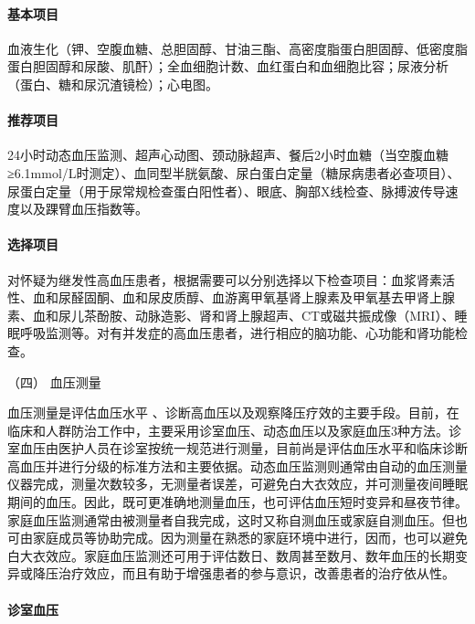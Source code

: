 \paragraph{基本项目}

血液生化（钾、空腹血糖、总胆固醇、甘油三酯、高密度脂蛋白胆固醇、低密度脂蛋白胆固醇和尿酸、肌酐）；全血细胞计数、血红蛋白和血细胞比容；尿液分析（蛋白、糖和尿沉渣镜检）；心电图。

\paragraph{推荐项目}

24小时动态血压监测、超声心动图、颈动脉超声、餐后2小时血糖（当空腹血糖≥6.1mmol/L时测定）、血同型半胱氨酸、尿白蛋白定量（糖尿病患者必查项目）、尿蛋白定量（用于尿常规检查蛋白阳性者）、眼底、胸部X线检查、脉搏波传导速度以及踝臂血压指数等。

\paragraph{选择项目}

对怀疑为继发性高血压患者，根据需要可以分别选择以下检查项目：血浆肾素活性、血和尿醛固酮、血和尿皮质醇、血游离甲氧基肾上腺素及甲氧基去甲肾上腺素、血和尿儿茶酚胺、动脉造影、肾和肾上腺超声、CT或磁共振成像（MRI）、睡眠呼吸监测等。对有并发症的高血压患者，进行相应的脑功能、心功能和肾功能检查。

\hypertarget{text00409.htmlux5cux23CHP17-3-1-3-4}{}
（四） 血压测量

血压测量是评估血压水平
、诊断高血压以及观察降压疗效的主要手段。目前，在临床和人群防治工作中，主要采用诊室血压、动态血压以及家庭血压3种方法。诊室血压由医护人员在诊室按统一规范进行测量，目前尚是评估血压水平和临床诊断高血压并进行分级的标准方法和主要依据。动态血压监测则通常由自动的血压测量仪器完成，测量次数较多，无测量者误差，可避免白大衣效应，并可测量夜间睡眠期间的血压。因此，既可更准确地测量血压，也可评估血压短时变异和昼夜节律。家庭血压监测通常由被测量者自我完成，这时又称自测血压或家庭自测血压。但也可由家庭成员等协助完成。因为测量在熟悉的家庭环境中进行，因而，也可以避免白大衣效应。家庭血压监测还可用于评估数日、数周甚至数月、数年血压的长期变异或降压治疗效应，而且有助于增强患者的参与意识，改善患者的治疗依从性。

\paragraph{诊室血压}

